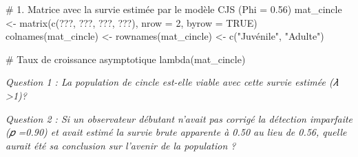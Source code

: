 \documentclass[
  french,
  a4paper,
  DIV=11,
  numbers=noendperiod,
  oneside]{scrreprt}
\newenvironment{Shaded}{}{}
\newcommand{\AttributeTok}[1]{\textcolor[rgb]{0.84,0.23,0.29}{#1}}
\newcommand{\CommentTok}[1]{\textcolor[rgb]{0.42,0.45,0.49}{#1}}
\newcommand{\ConstantTok}[1]{\textcolor[rgb]{0.00,0.36,0.77}{#1}}
\newcommand{\DecValTok}[1]{\textcolor[rgb]{0.00,0.36,0.77}{#1}}
\newcommand{\FunctionTok}[1]{\textcolor[rgb]{0.44,0.26,0.76}{#1}}
\newcommand{\NormalTok}[1]{\textcolor[rgb]{0.14,0.16,0.18}{#1}}
\newcommand{\OtherTok}[1]{\textcolor[rgb]{0.44,0.26,0.76}{#1}}
\newcommand{\StringTok}[1]{\textcolor[rgb]{0.01,0.18,0.38}{#1}}
\begin{document}
\begin{Shaded}
\begin{Highlighting}[]
\CommentTok{\# 1. Matrice avec la survie estimée par le modèle CJS (Phi = 0.56)}
\NormalTok{mat\_cincle }\OtherTok{\textless{}{-}} \FunctionTok{matrix}\NormalTok{(}\FunctionTok{c}\NormalTok{(???,    ???, }
\NormalTok{                       ???,  ???), }
                     \AttributeTok{nrow =} \DecValTok{2}\NormalTok{, }\AttributeTok{byrow =} \ConstantTok{TRUE}\NormalTok{)}
\FunctionTok{colnames}\NormalTok{(mat\_cincle) }\OtherTok{\textless{}{-}} \FunctionTok{rownames}\NormalTok{(mat\_cincle) }\OtherTok{\textless{}{-}} \FunctionTok{c}\NormalTok{(}\StringTok{"Juvénile"}\NormalTok{, }\StringTok{"Adulte"}\NormalTok{)}

\CommentTok{\# Taux de croissance asymptotique}
\FunctionTok{lambda}\NormalTok{(mat\_cincle)}
\end{Highlighting}
\end{Shaded}

\emph{Question 1 : La population de cincle est-elle viable avec cette
survie estimée (𝜆 \textgreater1)?}

\emph{Question 2 : Si un observateur débutant n'avait pas corrigé la
détection imparfaite (𝑝 =0.90) et avait estimé la survie brute apparente
à 0.50 au lieu de 0.56, quelle aurait été sa conclusion sur l'avenir de
la population ?}
\end{document}
